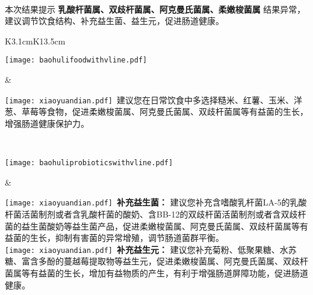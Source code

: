\noindent\fontsize{12pt}{12pt}\selectfont {菌群调理建议} \\

\vspace*{-2mm}
\begin{spacing}{1.3}
\noindent\fontsize{9pt}{11pt}\selectfont
本次结果提示 {\bf 乳酸杆菌属、双歧杆菌属、阿克曼氏菌属、柔嫩梭菌属} 结果异常，建议调节饮食结构、补充益生菌、益生元，促进肠道健康。
\end{spacing}

\setlength{\arrayrulewidth}{.5pt}
\vspace*{-2mm}
\begin{center}
\begin{tabular}{K{3.1cm}K{13.5cm}}
\hline

\parbox[c][3cm]{.95\hsize}{
\noindent
\texttt{[image: baohulifoodwithvline.pdf]}
}
 &
\parbox{\hsize}{
\vspace*{0.5mm}
\begin{spacing}{1.5}
\fontsize{10pt}{10pt}
{\texttt{[image: xiaoyuandian.pdf]}\fontsize{9pt}{10pt}\selectfont \ 建议您在日常饮食中多选择糙米、红薯、玉米、洋葱、草莓等食物，促进柔嫩梭菌属、阿克曼氏菌属、双歧杆菌属等有益菌的生长，增强肠道健康保护力。}
\end{spacing}
} \\
\hline

\parbox[c][4.5cm]{.95\hsize}{
\noindent
\texttt{[image: baohuliprobioticswithvline.pdf]}
}
 &
\parbox{\hsize}{
\vspace*{0.5mm}
\begin{spacing}{1.5}
\fontsize{10pt}{10pt}
{\texttt{[image: xiaoyuandian.pdf]}\fontsize{9pt}{10pt}\selectfont \ {\bf {补充益生菌：}} 建议您补充含嗜酸乳杆菌LA-5的乳酸杆菌活菌制剂或者含乳酸杆菌的酸奶、含BB-12的双歧杆菌活菌制剂或者含双歧杆菌的益生菌酸奶等益生菌产品，促进柔嫩梭菌属、阿克曼氏菌属、双歧杆菌属等有益菌的生长，抑制有害菌的异常增殖，调节肠道菌群平衡。 \\}
{\texttt{[image: xiaoyuandian.pdf]}\fontsize{9pt}{10pt}\selectfont \ {\bf {补充益生元：}} 建议您补充菊粉、低聚果糖、水苏糖、富含多酚的蔓越莓提取物等益生元，促进柔嫩梭菌属、阿克曼氏菌属、双歧杆菌属等有益菌的生长，增加有益物质的产生，有利于增强肠道屏障功能，促进肠道健康。}
\end{spacing}
} \\
\hline

\end{tabular}
\end{center}




